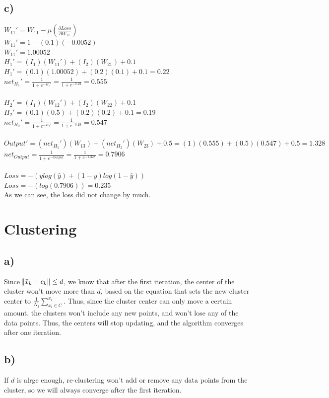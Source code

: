 \documentclass[12pt, letterpaper]{article}
\begin{document}
\subsection*{c)} $W_{11}' = W_{11} - \mu(\frac{\partial{Loss}}{\partial{W_{11}}})$\\
$W_{11}' = 1 - (0.1)(-0.0052)$\\
$W_{11}' = 1.00052$\\
$H_1' = (I_1)(W_{11}') + (I_2)(W_{21}) + 0.1$\\
$H_1' = (0.1)(1.00052) + (0.2)(0.1) + 0.1 = 0.22$\\
$net_{H_1}' = \frac{1}{1+e^{-H_1'}} = \frac{1}{1+e^{-0.22}} = 0.555$\\\\
$H_2' = (I_1)(W_{12}') + (I_2)(W_{22}) + 0.1$\\
$H_2' = (0.1)(0.5) + (0.2)(0.2) + 0.1 = 0.19$\\
$net_{H_2}' = \frac{1}{1+e^{-H_2'}} = \frac{1}{1+e^{-0.19}} = 0.547$\\\\
$Output' = (net_{H_1}')(W_{13}) + (net_{H_2}')(W_{23}) + 0.5 = (1)(0.555) + (0.5)(0.547) + 0.5 = 1.328$\\
$net_{Output} = \frac{1}{1+e^{-Output}} = \frac{1}{1+e^{-1.328}} = 0.7906$\\\\
$Loss = -(ylog(\hat{y}) + (1-y)log(1-\hat{y}))$\\
$Loss = -(log(0.7906)) = 0.235$\\
As we can see, the loss did not change by much.

\newpage
\section{Clustering}
\subsection*{a)} Since $\norm{\bar{x}_k-c_k} \leq d$, we know that after the first iteration, the center of the cluster won't move more than $d$, based on the equation that sets the new cluster center to $\frac{1}{N_j}\sum_{x_i\in C}^{x_i}$. Thus, since the cluster center can only move a certain amount, the clusters won't include any new points, and won't lose any of the data points. Thus, the centers will stop updating, and the algorithm converges after one iteration.

\subsection*{b)} If $d$ is alrge enough, re-clustering won't add or remove any data points from the cluster, so we will always converge after the first iteration.
\end{document}
